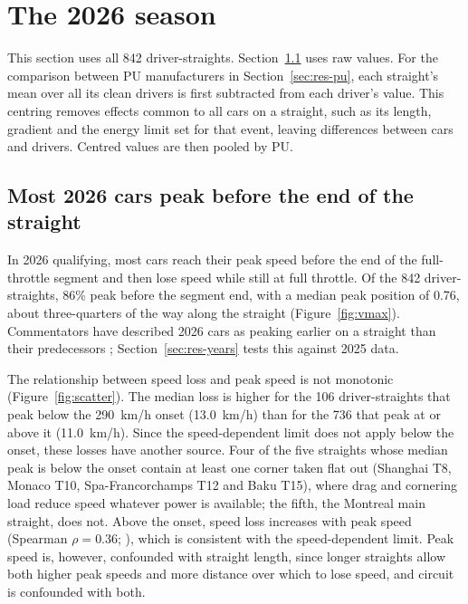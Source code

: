 \documentclass[11pt,a4paper]{article}
\begin{document}
\section{The 2026 season}
\label{sec:season}

This section uses all 842 driver-straights. Section~\ref{sec:res-peak} uses raw values. For the comparison between PU manufacturers in Section~\ref{sec:res-pu}, each straight's mean over all its clean drivers is first subtracted from each driver's value. This centring removes effects common to all cars on a straight, such as its length, gradient and the energy limit set for that event, leaving differences between cars and drivers. Centred values are then pooled by PU.

\subsection{Most 2026 cars peak before the end of the straight}
\label{sec:res-peak}

In 2026 qualifying, most cars reach their peak speed before the end of the full-throttle segment and then lose speed while still at full throttle. Of the 842 driver-straights, 86\% peak before the segment end, with a median peak position of 0.76, about three-quarters of the way along the straight (Figure~\ref{fig:vmax}). Commentators have described 2026 cars as peaking earlier on a straight than their predecessors \citep{therace2026fix}; Section~\ref{sec:res-years} tests this against 2025 data.

The relationship between speed loss and peak speed is not monotonic (Figure~\ref{fig:scatter}). The median loss is higher for the 106 driver-straights that peak below the 290~km/h onset (13.0~km/h) than for the 736 that peak at or above it (11.0~km/h). Since the speed-dependent limit does not apply below the onset, these losses have another source. Four of the five straights whose median peak is below the onset contain at least one corner taken flat out (Shanghai T8, Monaco T10, Spa-Francorchamps T12 and Baku T15), where drag and cornering load reduce speed whatever power is available; the fifth, the Montreal main straight, does not. Above the onset, speed loss increases with peak speed (Spearman $\rho = 0.36$; \citealp{spearman1904}), which is consistent with the speed-dependent limit. Peak speed is, however, confounded with straight length, since longer straights allow both higher peak speeds and more distance over which to lose speed, and circuit is confounded with both.
\end{document}
